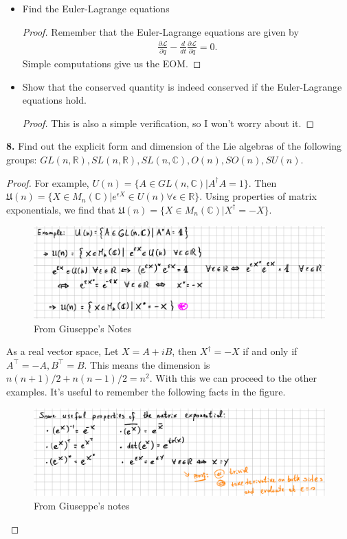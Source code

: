 \documentclass{book}
\theoremstyle{definition}
\newcommand{\p}{\partial}
\newcommand{\R}{\mathbb{R}}
\newcommand{\C}{\mathbb{C}}
\newcommand{\lag}{\mathcal{L}}
\newcommand{\ep}{\epsilon}
\newcommand{\f}[2]{\frac{#1}{#2}}
\begin{document}
\begin{itemize}
	\item Find the Euler-Lagrange equations
	\begin{proof}
	Remember that the Euler-Lagrange equations are given by
	\begin{align}
	\f{\p \lag}{\p q} - \f{d}{dt}\f{\p \lag}{\p \dot{q}} =0.
	\end{align}
	Simple computations give us the EOM.
	\end{proof}

	\item Show that the conserved quantity is indeed conserved if the Euler-Lagrange equations hold. 
	\begin{proof}
	This is also a simple verification, so I won't worry about it. 
	\end{proof}

	
\end{itemize}


\noindent \textbf{8.} Find out the explicit form and dimension of the Lie algebras of the following groups: $GL(n,\R), SL(n,\R), SL(n,\C), O(n), SO(n), SU(n)$. 

\begin{proof}
	For example, $U(n) = \{ A\in GL(n,\C)  \vert A^\dagger A = 1\}$. Then $\mathfrak{U}(n) = \{ X\in M_n(\C) \vert e^{\ep X}\in U(n) \forall \ep \in \R   \}$. Using properties of matrix exponentials, we find that $\mathfrak{U}(n) = \{ X\in M_n(\C) \vert X^\dagger = -X   \}$. 
	\begin{figure}[!htb]
		\centering
		\includegraphics[scale=0.3]{lie1}
		\caption{From Giuseppe's Notes}
	\end{figure}
	
	As a real vector space, Let $X = A + iB$, then $X^\dagger = -X$ if and only if $A^\top = -A, B^\top = B$. This means the dimension is $n(n+1)/2 + n(n-1)/2 = n^2$. With this we can proceed to the other examples. It's useful to remember the following facts in the figure.
	\begin{figure}[!htb]
		\centering
		\includegraphics[scale=0.4]{lie2}
		\caption{From Giuseppe's notes}
	\end{figure}

\end{proof}
\end{document}
